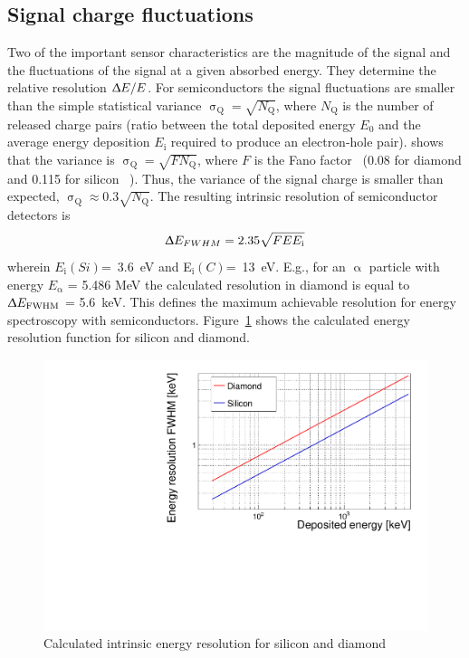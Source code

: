 \subsection{Signal charge fluctuations}
Two of the important sensor characteristics are the magnitude of the signal and the fluctuations of the signal at a given absorbed energy. They determine the relative resolution $\Updelta E/E$. For semiconductors the signal fluctuations are smaller than the simple statistical variance $\upsigma_\mathrm{Q}=\sqrt{N_\mathrm{Q}}$, where $N_\mathrm{Q}$ is the number of released charge pairs (ratio between the total deposited energy $E_\mathrm{0}$ and the average energy deposition $E_\mathrm{i}$ required to produce an electron-hole pair). \cite{} shows that the variance is $\upsigma_\mathrm{Q}=\sqrt{F N_\mathrm{Q}}$, where $F$ is the Fano factor~\cite{} (0.08 for diamond and 0.115 for silicon ~\cite{}). Thus, the variance of the signal charge is smaller than expected, $\upsigma_\mathrm{Q}\approx0.3 \sqrt{N_\mathrm{Q}}$. The resulting intrinsic resolution of semiconductor detectors is 
\begin{equation}
\label{eq:efwhm}
\Updelta E_{FWHM} = 2.35 \sqrt{FEE_\mathrm{i}} 
\end{equation} 
wherein $E_\mathrm{i}(Si)$=~3.6~eV and E$_\mathrm{i}(C)$=~13~eV. E.g., for an $\upalpha$ particle with energy $E_\upalpha$ = 5.486 MeV the calculated resolution in diamond is equal to $\Updelta E_{\mathrm{FWHM}}$ = 5.6~keV. This defines the maximum achievable resolution for energy spectroscopy with semiconductors. Figure~\ref{fig:enerres} shows the calculated energy resolution function for silicon and diamond.

\begin{figure}[!t]
\begin{center}
\includegraphics[width=0.8\linewidth]{../scripts/02_pulse_formation/plots/resolution}
\caption{Calculated intrinsic energy resolution for silicon and diamond}
\label{fig:enerres}
\end{center}
\end{figure}




